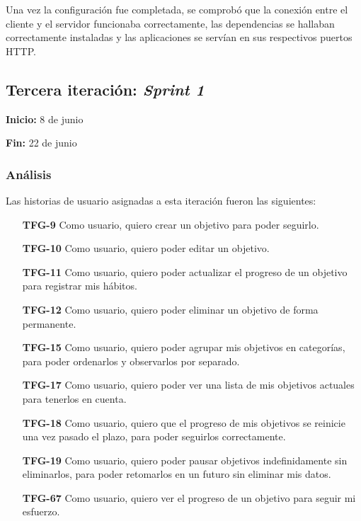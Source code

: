 \documentclass[10pt, a4paper]{aqademic}
\begin{document}
Una vez la configuración fue completada, se comprobó que la conexión entre el cliente y el servidor funcionaba correctamente, las dependencias se hallaban correctamente instaladas y las aplicaciones se servían en sus respectivos puertos HTTP.


\subsection{Tercera iteración: \textit{Sprint 1}}

\textbf{Inicio:} 8 de junio

\textbf{Fin:} 22 de junio


\subsubsection{Análisis}

Las historias de usuario asignadas a esta iteración fueron las siguientes:

\begin{itemize}[leftmargin=16mm]
	\item [\textbf{TFG-9}] Como usuario, quiero crear un objetivo para poder seguirlo.
	
	\item [\textbf{TFG-10}] Como usuario, quiero poder editar un objetivo.
	
	\item [\textbf{TFG-11}] Como usuario, quiero poder actualizar el progreso de un objetivo para registrar mis hábitos.
	
	\item [\textbf{TFG-12}] Como usuario, quiero poder eliminar un objetivo de forma permanente.
	
	\item [\textbf{TFG-15}] Como usuario, quiero poder agrupar mis objetivos en categorías, para poder ordenarlos y observarlos por separado.
	
	\item [\textbf{TFG-17}] Como usuario, quiero poder ver una lista de mis objetivos actuales para tenerlos en cuenta.
	
	\item [\textbf{TFG-18}] Como usuario, quiero que el progreso de mis objetivos se reinicie una vez pasado el plazo, para poder seguirlos correctamente.
	
	
	\item [\textbf{TFG-19}] Como usuario, quiero poder pausar objetivos indefinidamente sin eliminarlos, para poder retomarlos en un futuro sin eliminar mis datos.
	
	\item [\textbf{TFG-67}] Como usuario, quiero ver el progreso de un objetivo para seguir mi esfuerzo.
\end{itemize}
\end{document}

